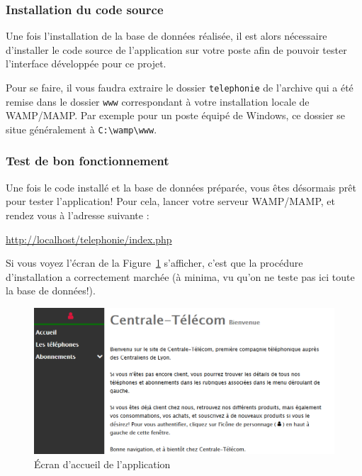 \subsubsection{Installation du code source}
Une fois l'installation de la base de données réalisée, il est alors nécessaire d'installer le code source de l'application sur votre poste afin de pouvoir tester l'interface développée pour ce projet.

Pour se faire, il vous faudra extraire le dossier \texttt{telephonie} de l'archive qui a été remise dans le dossier \texttt{www} correspondant à votre installation locale de WAMP/MAMP. Par exemple pour un poste équipé de Windows, ce dossier se situe généralement à \texttt{C:\textbackslash wamp\textbackslash www}.

\subsubsection{Test de bon fonctionnement}
Une fois le code installé et la base de données préparée, vous êtes désormais prêt pour tester l'application! Pour cela, lancer votre serveur WAMP/MAMP, et rendez vous à l'adresse suivante :
\begin{center}
  \url{http://localhost/telephonie/index.php}
\end{center}
Si vous voyez l'écran de la Figure~\ref{fig:hello-world} s'afficher, c'est que la procédure d'installation a correctement marchée (à minima, vu qu'on ne teste pas ici toute la base de données!).

\begin{figure}[ht]
  \centering
  \includegraphics[width=.55\textwidth]{images/Travail_realise/hello-world}
  \caption{\'Ecran d'accueil de l'application}
  \label{fig:hello-world}
\end{figure}


